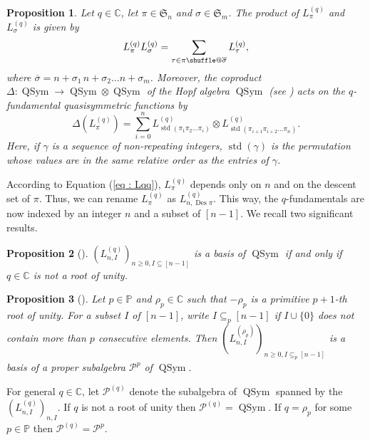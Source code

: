 \documentclass[revision]{FPSAC2024}
\makeatletter
\newtheorem{proposition}{Proposition}
\newcommand{\CC}{\mathbb{C}} %
\newcommand{\PP}{\mathbb{P}} %
\newcommand{\QSym}{\operatorname{QSym}}
\newcommand{\std}{\operatorname{std}}
\newcommand{\Des}{\operatorname{Des}}
\providecommand*{\shuffle}{%
  \mathbin{\mathpalette\shuffle@{}}%
}
\newcommand*{\shuffle@}[2]{%
  \sbox0{$#1\vcenter{}$}%
  \kern .15\ht0 %
  \rlap{\vrule height .25\ht0 depth 0pt width 2.5\ht0}%
  \raise.1\ht0\hbox to 2.5\ht0{%
    \vrule height 1.75\ht0 depth -.1\ht0 width .17\ht0 %
    \hfill
    \vrule height 1.75\ht0 depth -.1\ht0 width .17\ht0 %
    \hfill
    \vrule height 1.75\ht0 depth -.1\ht0 width .17\ht0 %
  }%
  \kern .15\ht0 %
}
\makeatother
\begin{document}
\begin{proposition}
Let $q \in \CC$, let $\pi \in \mathfrak{S}_n$ and $\sigma \in \mathfrak{S}_m$. The product of $L^{(q)}_{\pi}$ and $L^{(q)}_{\sigma}$  is given by
\begin{equation}
\label{eq : LL}
L^{(q)}_{\pi}L^{(q)}_{\sigma}=\sum_{\tau\in \pi \shuffle \overline{\sigma}}L^{(q)}_{\tau},
\end{equation}
where $\overline{\sigma} = n+\sigma_1\,n+\sigma_2 \dots n+\sigma_m$. Moreover, the coproduct $\Delta:\operatorname*{QSym}\rightarrow \operatorname*{QSym}\otimes\operatorname*{QSym}$ of the Hopf algebra
$\operatorname*{QSym}$ (see \cite[\S 5.1]{GriRei20}) acts on the $q$-fundamental quasisymmetric functions by
\begin{equation*}
\Delta(L^{(q)}_{\pi})
= \sum_{i=0}^n L^{(q)}_{\std(\pi_1\pi_2\dots \pi_i)} \otimes
L^{(q)}_{\std(\pi_{i+1}\pi_{i+2}\dots \pi_n)}.
\end{equation*}
Here, if $\gamma$ is a sequence of non-repeating integers, $\std(\gamma)$ is the permutation whose values are in the same relative order as the entries of $\gamma$.
\end{proposition}
According to Equation (\ref{eq : Lqq}), $L_{\pi}^{(q)}$ depends only on $n$ and on the descent set of $\pi$. Thus, we can rename $L_{\pi}^{(q)}$ as $L_{n, \Des \pi}^{(q)}$. This way, the $q$-fundamentals are now indexed by an integer $n$ and a subset of $[n-1]$. We recall two significant results. 
\begin{proposition}[\cite{GriVas22}]
\label{prop : basis} $(L_{n, I}^{(q)})_{n\geq0, I\subseteq[n-1]}$ is a basis of $\QSym$ if and only if $q \in \CC$ is not a root of unity.
\end{proposition}
\begin{proposition}[\cite{GriVas23}]\label{prop : roots} Let $p \in \PP$ and $\rho_p \in \CC$ such that $-\rho_p$ is a primitive $p+1$-th root of unity. For a subset $I$ of $[n-1]$, write $I \subseteq_p [n-1]$ if $I \cup \{0\}$ does not contain more than $p$ consecutive elements. Then $(L_{n, I}^{(\rho_p)})_{n\geq0, I\subseteq_p[n-1]}$ is a basis of a proper subalgebra $\mathcal{P}^p$ of $\QSym$. 
\end{proposition}
For general $q \in \CC$, let $\mathcal{P}^{(q)}$ denote the subalgebra of $\QSym$ spanned by the $(L_{n, I}^{(q)})_{n, I}$. If $q$ is not a root of unity then $\mathcal{P}^{(q)} = \QSym$. If $q=\rho_p$ for some $p \in \PP$ then $\mathcal{P}^{(q)} = \mathcal{P}^p$.

\end{document}
